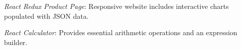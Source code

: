 

\begin{cvitems}
    \vspace{4.0mm}
    \item {\textit{React Redux Product Page}: Responsive website includes interactive charts populated with JSON data.}
    \vspace{-0.5mm}
    \item {\textit{React Calculator}: Provides essential arithmetic operations and an expression builder.}

\vspace{3.0mm}
\end{cvitems}
